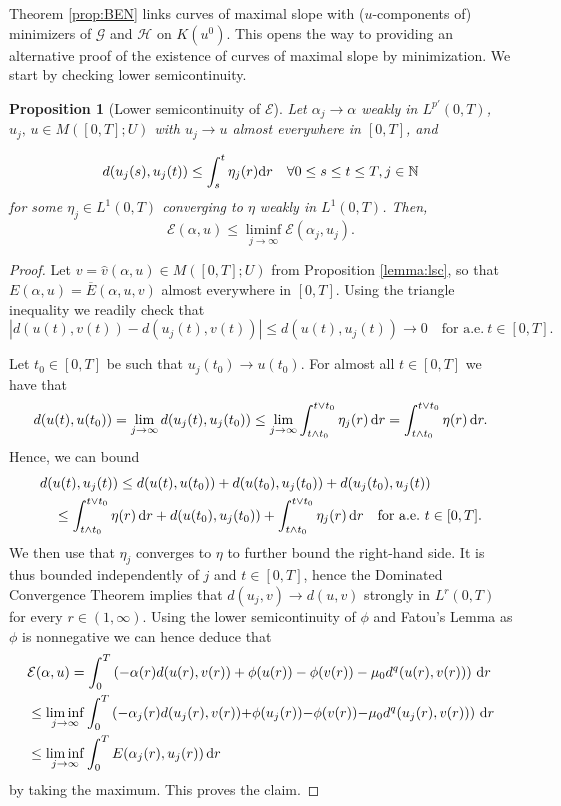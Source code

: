 \documentclass[reqno]{amsart}
\newcommand{\Nz}{\mathbb{N}}
\newcommand{\dr}{{\rm d} r}
\newcommand{\ove}{\overline}
\newcommand{\haz}{\widehat}
\newcommand{\GG}{{\mathcal G}}
\newcommand{\EE}{{\mathcal E}}
\newcommand{\HH}{{\mathcal H}}
\renewcommand{\d}{{\rm d}}
\newtheorem{proposition}[theorem]{Proposition}
\begin{document}
 Theorem  \ref{prop:BEN} links curves of maximal slope with
($u$-components of) minimizers of $\GG$  and $\HH$  
on $K(u^0)$. This opens
the way  to   providing an alternative proof of the existence of curves
of maximal slope by minimization. We start by checking lower
semicontinuity.
 


\begin{proposition}[Lower semicontinuity of $\EE$]\label{prop:BBlsc}
   Let  $\alpha_j \to \alpha$ weakly in $L^{ p'}(0,T)$, $u_j, \, u \in
   M  ([0,T];U)$ with  $u_j\to u$ almost everywhere in
  $[0,T]$,     and 
  
  \[
 d(u_j(s), u_j(t)) \le \int_s^t \eta_j(r) \dr \quad \forall 0 \le s \le t \le T, j \in \Nz
  \]
   for some $\eta_j \in L^1(0,T)$ converging to $\eta$ weakly in $L^1(0,T)$.  Then, 
  \begin{equation*}
    \EE (\alpha,u)\leq \liminf_{j\to \infty} \EE(\alpha_j,u_j).
  \end{equation*} 
\end{proposition}
\begin{proof} 
  Let $ v = \haz v(\alpha,u) \in M([0,T];U)$ from Proposition
  \ref{lemma:lsc}, so that $ E(\alpha,u) =
  \ove E(\alpha,u, v)$  almost everywhere in  $[0,T]$.
 Using the triangle inequality
  we readily check that
$$|d(u(t), v (t)) - d(u_j(t), v(t))| \leq d(u(t),u_j(t))\to 0
\quad  \text{for a.e.} \ t \in [0,T].$$
 
   Let $t_0\in [0,T]$ be such that $u_j(t_0)\to u(t_0)$. For almost all $t \in [0,T]$ we have that
  $$d(u(t),u(t_0)) = \lim_{j\to \infty}d(u_j(t),u_j(t_0)) \leq  \lim_{j \to \infty} \int_{t\wedge t_0}^{t\vee t_0} \eta_j(r) \,\d r =  \int_{t\wedge t_0}^{t\vee t_0} \eta(r)\, \d r. $$
Hence, we can bound
\begin{align*}
  &d(u(t),u_j(t)) \leq  d(u(t),u(t_0)) + d(u(t_0),u_j(t_0)) +
 d(u_j(t_0),u_j(t))  \\
  &\quad  \leq \int_{t\wedge t_0}^{t\vee t_0} \eta (r)\, \dr +  d(u(t_0),u_j(t_0)) + \int_{t\wedge t_0}^{t\vee t_0} 
     \eta_j (r)\, \d r  \quad \text{for a.e.} \ t \in [0,T].
\end{align*}
We then use that $\eta_j$  converges  to  $\eta$ to further bound  the right-hand side. It is thus bounded independently of $j$ and $t
\in [0,T]$, hence the
Dominated Convergence Theorem implies that $d(u_j, v) \to
d(u, v)$ strongly in  $L^r(0,T)$  for every $r \in (1,\infty)$.   
  Using the lower semicontinuity of $\phi$ and Fatou's Lemma  as
  $ \phi  $ is nonnegative  we can
  hence  deduce that 
  \begin{align*}
    &\EE(\alpha,u) = \int_0^T
    \left(-\alpha(r)d(u(r), v(r))+\phi(u(r)) - \phi( v (r))
    -  \mu_0  d^q(u(r), v (r)) \right)\, \dr \\
    &\leq \liminf_{j\to \infty} \int_0^T
    \left(-\alpha_j(r)d(u_j(r), v(r)){+}\phi(u_j(r)) {-} \phi( v (r))
     {-}  \mu_0  d^q(u_j(r), v (r))  \right)\, \dr \\
    & \leq \liminf_{j\to \infty} \int_0^T  E
    (\alpha_j(r),u_j (r))\, \dr
  \end{align*}
   by taking the maximum. This proves  the claim.
\end{proof}
\end{document}
